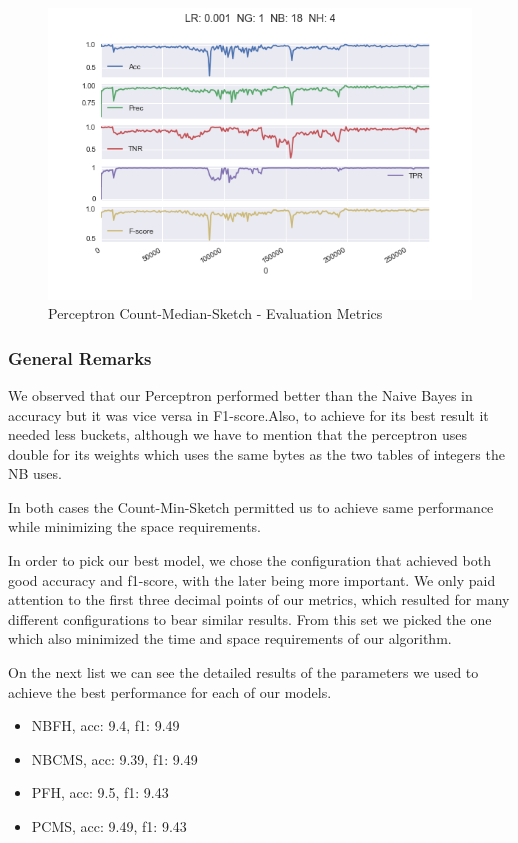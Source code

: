 \documentclass[12pt]{article}
\begin{document}
\begin{figure}[h]
    \centering
    \includegraphics[scale=0.8]{./SpamFilter/code/pcmscurve}
    \caption{Perceptron Count-Median-Sketch - Evaluation Metrics}
    \label{pcmsc}
\end{figure}

\subsubsection{General Remarks}

We observed that our Perceptron performed better than the Naive Bayes in accuracy but it was vice versa in F1-score.Also, to achieve for its best result it needed less buckets, although we have to mention that the perceptron uses double for its weights which uses the same bytes as the two tables of integers the NB uses. 

In both cases the Count-Min-Sketch permitted us to achieve same performance while minimizing the space requirements. 

In order to pick our best model, we chose the configuration that achieved both good accuracy and f1-score, with the later being more important. We only paid attention to the first three decimal points of our metrics, which resulted for many different configurations to bear similar results. From this set we picked the one which also minimized the time and space requirements of our algorithm.

On the next list we can see the detailed results of the parameters we used to achieve the best performance for each of our models.
 

\begin{itemize}
 \item NBFH, acc: 9.4, f1: 9.49\\ 
 \item NBCMS, acc:  9.39, f1:  9.49\\ 
 \item PFH, acc: 9.5, f1: 9.43\\ 
 \item  PCMS, acc: 9.49, f1: 9.43\\ 
\end{itemize}
\end{document}

